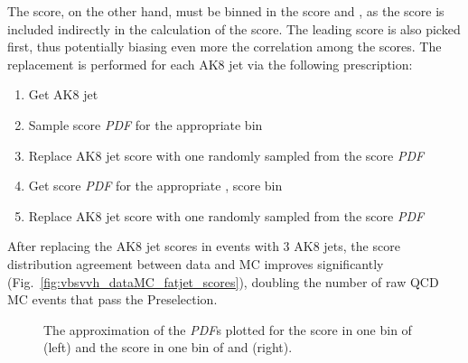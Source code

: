The \ParticleNet \XWtoqq score, on the other hand, must be binned in the \Xtobb score and \pt, as the \Xtobb score is included indirectly in the calculation of the \XWtoqq score. 
The leading \Xtobb score is also picked first, thus potentially biasing even more the correlation among the scores.
The replacement is performed for each AK8 jet via the following prescription:
\begin{enumerate}
    \item Get AK8 jet \pt
    \item Sample \Xtobb score \textit{PDF} for the appropriate \pt bin
    \item Replace AK8 jet \Xtobb score with one randomly sampled from the \Xtobb score \textit{PDF}
    \item Get \XWtoqq score \textit{PDF} for the appropriate \pt, \Xtobb score bin
    \item Replace AK8 jet \XWtoqq score with one randomly sampled from the \XWtoqq score \textit{PDF}
\end{enumerate}
After replacing the AK8 jet scores in events with 3 AK8 jets, the \ParticleNet score distribution agreement between data and MC improves significantly (Fig.~\ref{fig:vbsvvh_dataMC_fatjet_scores}), doubling the number of raw QCD MC events that pass the Preselection.

\begin{figure}[htb]
    \centering
    \qquad
    \caption[The approximation of the \ParticleNet \textit{PDF}s]{
        The approximation of the \ParticleNet \textit{PDF}s plotted for the \Xtobb score in one bin of \pt (left) and the \XWtoqq score in one bin of \pt and \Xtobb (right). 
    }
    \label{fig:vbsvvh_pnetpdf}
\end{figure}

